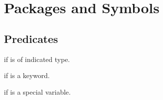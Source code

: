 %
%

\section{Packages and Symbols}

\subsection{Predicates}
\begin{LIST}{1cm}

  {
  \retval{\T} if  is of indicated type.
  }

  {
  \retval{\T} if  is a keyword.
  }

  {
  \retval{\T} if  is a special variable.
  }

\end{LIST}


